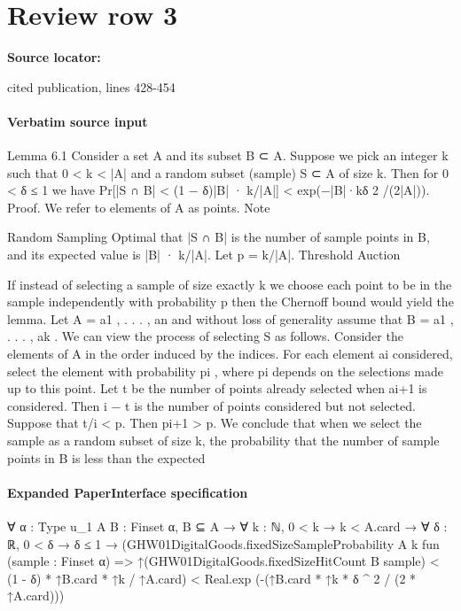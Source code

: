 \documentclass[10pt]{article}
\begin{document}
\section*{Review row 3}
\textbf{Source locator:} {\footnotesize\raggedright cited publication, lines 428-\allowbreak{}454\par}
\paragraph{Verbatim source input}
\begin{ReviewVerbatim}
Lemma 6.1 Consider a set A and its subset B ⊂ A.
Suppose we pick an integer k such that 0 < k < |A|
and a random subset (sample) S ⊂ A of size k. Then
for 0 < δ ≤ 1 we have
Pr[|S ∩ B| < (1 − δ)|B| · k/|A|] < exp(−|B|·kδ 2 /(2|A|)).
Proof. We refer to elements of A as points. Note

Random Sampling Optimal that |S ∩ B| is the number of sample points in B,
and its expected value is |B| · k/|A|. Let p = k/|A|.
Threshold Auction

If instead of selecting a sample of size exactly k we
choose each point to be in the sample independently
with probability p then the Chernoff bound would
yield the lemma.
Let A = {a1 , . . . , an } and without loss of generality assume that B = {a1 , . . . , ak }. We can view
the process of selecting S as follows. Consider the
elements of A in the order induced by the indices.
For each element ai considered, select the element
with probability pi , where pi depends on the selections made up to this point.
Let t be the number of points already selected when
ai+1 is considered. Then i − t is the number of points
considered but not selected. Suppose that t/i < p.
Then pi+1 > p.
We conclude that when we select the sample as a
random subset of size k, the probability that the number of sample points in B is less than the expected
\end{ReviewVerbatim}



\paragraph{Expanded PaperInterface specification}
\begin{ReviewVerbatim}
∀ {α : Type u_1} {A B : Finset α},
  B ⊆ A →
    ∀ {k : ℕ},
      0 < k →
        k < A.card →
          ∀ {δ : ℝ},
            0 < δ →
              δ ≤ 1 →
                (GHW01DigitalGoods.fixedSizeSampleProbability A k fun (sample : Finset α) =>
                    ↑(GHW01DigitalGoods.fixedSizeHitCount B sample) < (1 - δ) * ↑B.card * ↑k / ↑A.card) <
                  Real.exp (-(↑B.card * ↑k * δ ^ 2 / (2 * ↑A.card)))
\end{ReviewVerbatim}
\end{document}
